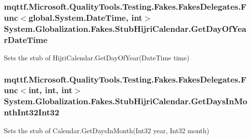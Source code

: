 \hypertarget{class_system_1_1_globalization_1_1_fakes_1_1_stub_hijri_calendar_ad31701fbb138bda0510060ed4799187c}{
\subsubsection[{Get\-Day\-Of\-Year\-Date\-Time}]{\setlength{\rightskip}{0pt plus 5cm}mqttf.\-Microsoft.\-Quality\-Tools.\-Testing.\-Fakes.\-Fakes\-Delegates.\-Func$<$global.\-System.\-Date\-Time, int$>$ System.\-Globalization.\-Fakes.\-Stub\-Hijri\-Calendar.\-Get\-Day\-Of\-Year\-Date\-Time}}\label{class_system_1_1_globalization_1_1_fakes_1_1_stub_hijri_calendar_ad31701fbb138bda0510060ed4799187c}


Sets the stub of Hijri\-Calendar.\-Get\-Day\-Of\-Year(\-Date\-Time time)

\hypertarget{class_system_1_1_globalization_1_1_fakes_1_1_stub_hijri_calendar_a3b4cdc825393d2ebcc5249359fbb2945}{
\subsubsection[{Get\-Days\-In\-Month\-Int32\-Int32}]{\setlength{\rightskip}{0pt plus 5cm}mqttf.\-Microsoft.\-Quality\-Tools.\-Testing.\-Fakes.\-Fakes\-Delegates.\-Func$<$int, int, int$>$ System.\-Globalization.\-Fakes.\-Stub\-Hijri\-Calendar.\-Get\-Days\-In\-Month\-Int32\-Int32}}\label{class_system_1_1_globalization_1_1_fakes_1_1_stub_hijri_calendar_a3b4cdc825393d2ebcc5249359fbb2945}


Sets the stub of Calendar.\-Get\-Days\-In\-Month(\-Int32 year, Int32 month)

